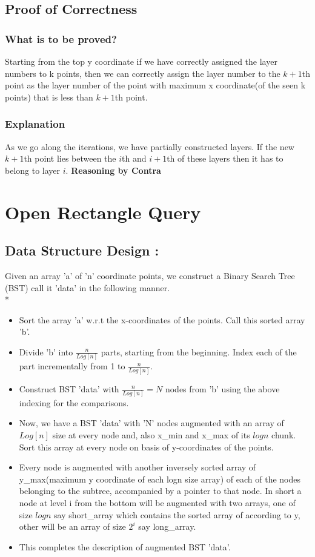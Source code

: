 \documentclass{article}
\begin{document}
\subsection{Proof of Correctness}
\subsubsection{What is to be proved?}
Starting from the top y coordinate if we have correctly assigned the layer numbers to k points, then we can correctly assign the layer number to the $k+1$th point as the layer number of the point with maximum x coordinate(of the seen k points) that is less than $k+1$th point.
\subsubsection{Explanation}
As we go along the iterations, we have partially constructed layers. If the new $k+1$th point lies between the $i$th and $i+1$th of these layers then it has to belong to layer $i$. 
{\bf Reasoning by Contra}

\newpage
\section{ Open Rectangle Query }
\subsection{Data Structure Design : } 
Given an array 'a' of 'n' coordinate points, we construct a Binary Search Tree (BST) call it 'data' in the following manner.\\*
\begin{itemize}
\item Sort the array 'a' w.r.t the x-coordinates of the points. Call this sorted array 'b'.
\item Divide 'b' into $ \frac{n}{Log[n]} $ parts, starting from the beginning. Index each of the part incrementally from 1 to $ \frac{n}{Log[n]} $. 
\item Construct BST 'data' with $ \frac{n}{Log[n]} = N $ nodes from 'b' using the above indexing for the comparisons.
\item Now, we have a BST 'data' with 'N' nodes augmented with an array of $Log[n]$ size at every node and, also
    x\_min and x\_max of its $logn$ chunk. Sort this array at every node on basis of y-coordinates of the points.
\item Every node is augmented with another inversely sorted array of y\_max(maximum y coordinate of each logn size array)
    of each of the nodes belonging to the subtree, accompanied by a pointer to that node. 
    In short a node at level i from the bottom will be augmented with two arrays, one of size $logn$ say short\_array
    which contains the sorted array of according to y, other will be an array of size $2^i$ say long\_array.
\item This completes the description of augmented BST 'data'.
\end{itemize}
\end{document}
